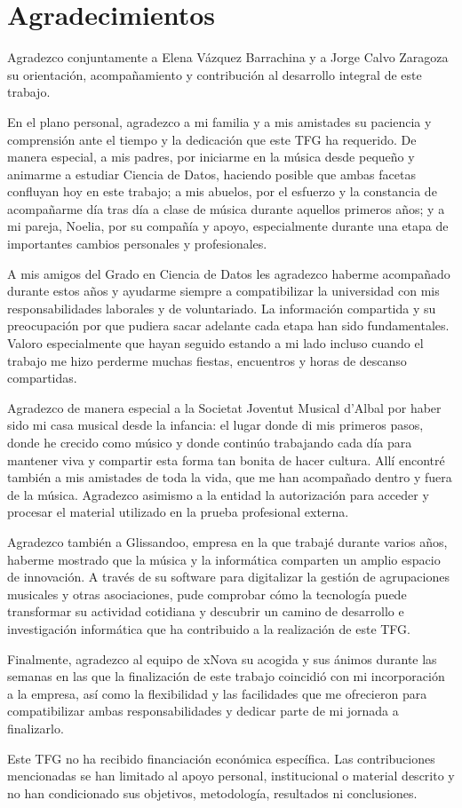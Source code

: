 \chapter*{Agradecimientos}

Agradezco conjuntamente a Elena Vázquez Barrachina y a Jorge Calvo Zaragoza su orientación,
acompañamiento y contribución al desarrollo integral de este trabajo.

En el plano personal, agradezco a mi familia y a mis amistades su paciencia y comprensión ante
el tiempo y la dedicación que este TFG ha requerido. De manera especial, a mis padres, por
iniciarme en la música desde pequeño y animarme a estudiar Ciencia de Datos, haciendo posible
que ambas facetas confluyan hoy en este trabajo; a mis abuelos, por el esfuerzo y la constancia
de acompañarme día tras día a clase de música durante aquellos primeros años; y a mi pareja,
Noelia, por su compañía y apoyo, especialmente durante una etapa de importantes cambios
personales y profesionales.

A mis amigos del Grado en Ciencia de Datos les agradezco haberme acompañado durante estos años
y ayudarme siempre a compatibilizar la universidad con mis responsabilidades laborales y de
voluntariado. La información compartida y su preocupación por que pudiera sacar adelante cada
etapa han sido fundamentales. Valoro especialmente que hayan seguido estando a mi lado incluso
cuando el trabajo me hizo perderme muchas fiestas, encuentros y horas de descanso compartidas.

Agradezco de manera especial a la Societat Joventut Musical d'Albal por haber sido mi casa
musical desde la infancia: el lugar donde di mis primeros pasos, donde he crecido como músico y
donde continúo trabajando cada día para mantener viva y compartir esta forma tan bonita de hacer
cultura. Allí encontré también a mis amistades de toda la vida, que me han acompañado dentro y
fuera de la música. Agradezco asimismo a la entidad la autorización para acceder y procesar el
material utilizado en la prueba profesional externa.

Agradezco también a Glissandoo, empresa en la que trabajé durante varios años, haberme mostrado
que la música y la informática comparten un amplio espacio de innovación. A través de su
software para digitalizar la gestión de agrupaciones musicales y otras asociaciones, pude
comprobar cómo la tecnología puede transformar su actividad cotidiana y descubrir un camino de
desarrollo e investigación informática que ha contribuido a la realización de este TFG.

Finalmente, agradezco al equipo de xNova su acogida y sus ánimos durante las semanas en las que
la finalización de este trabajo coincidió con mi incorporación a la empresa, así como la
flexibilidad y las facilidades que me ofrecieron para compatibilizar ambas responsabilidades y
dedicar parte de mi jornada a finalizarlo.

Este TFG no ha recibido financiación económica específica. Las contribuciones mencionadas se
han limitado al apoyo personal, institucional o material descrito y no han condicionado sus
objetivos, metodología, resultados ni conclusiones.

\clearpage
